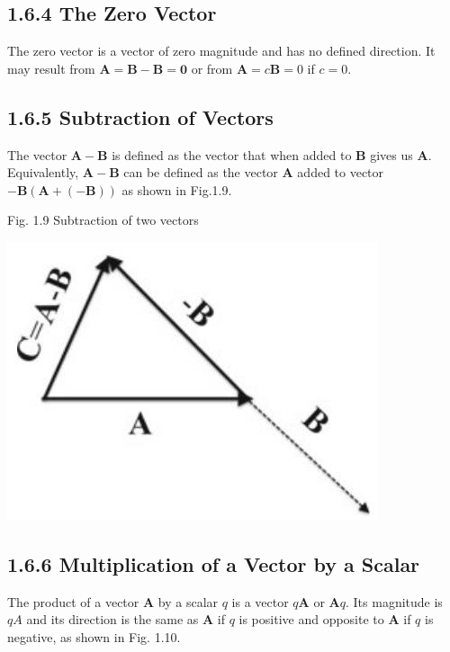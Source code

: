 \documentclass[10pt]{article}
\begin{document}
\subsection*{1.6.4 The Zero Vector}
The zero vector is a vector of zero magnitude and has no defined direction. It may result from $\mathbf{A}=\mathbf{B}-\mathbf{B}=\mathbf{0}$ or from $\mathbf{A}=c \mathbf{B}=0$ if $c=0$.

\subsection*{1.6.5 Subtraction of Vectors}
The vector $\mathbf{A}-\mathbf{B}$ is defined as the vector that when added to $\mathbf{B}$ gives us $\mathbf{A}$. Equivalently, $\mathbf{A}-\mathbf{B}$ can be defined as the vector $\mathbf{A}$ added to vector $-\mathbf{B}(\mathbf{A}+(-\mathbf{B}))$ as shown in Fig.1.9.

Fig. 1.9 Subtraction of two vectors

\begin{center}
\includegraphics[max width=\textwidth]{2024_09_13_db1f357d2aad0a03eb2eg-015}
\end{center}

\subsection*{1.6.6 Multiplication of a Vector by a Scalar}
The product of a vector $\mathbf{A}$ by a scalar $q$ is a vector $q \mathbf{A}$ or $\mathbf{A} q$. Its magnitude is $q A$ and its direction is the same as $\mathbf{A}$ if $q$ is positive and opposite to $\mathbf{A}$ if $q$ is negative, as shown in Fig. 1.10.
\end{document}
